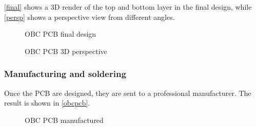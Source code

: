 \newpage

\autoref{final} shows a 3D render of the top and bottom layer in the final design, while \autoref{persp} shows a perspective view from different angles. 			





			\begin{figure}[H]
			\centering
			\quad
			\caption{\acrshort{OBC} \acrshort{PCB} final design} \label{final}
\end{figure}

\vspace{1cm}


		\begin{figure}[H]
			\centering
			\quad
			\caption{\acrshort{OBC} \acrshort{PCB} 3D perspective} \label{persp}
			\vspace{-2cm}
\end{figure}
%
%
%



\newpage

\subsubsection{Manufacturing and soldering} \label{obcmanuf}

Once the \acrshort{PCB} are designed, they are sent to a professional manufacturer. The result is shown in \autoref{obcpcb}.

\begin{figure}[H]
			\centering
			\quad
			\caption{\acrshort{OBC} \acrshort{PCB} manufactured} \label{obcpcb}
\end{figure}


